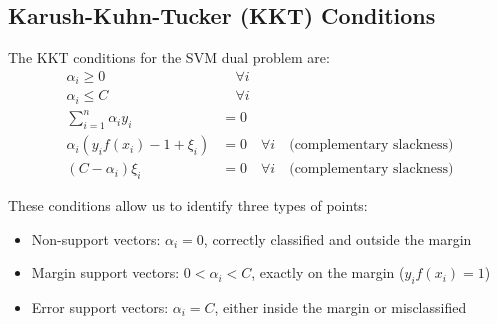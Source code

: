 \documentclass[11pt]{article}
\begin{document}

\subsection{Karush-Kuhn-Tucker (KKT) Conditions}
The KKT conditions for the SVM dual problem are:
\begin{align}
\alpha_i \geq 0 &\quad \forall i \\
\alpha_i \leq C &\quad \forall i \\
\sum_{i=1}^n \alpha_i y_i &= 0 \\
\alpha_i(y_i f(x_i) - 1 + \xi_i) &= 0 \quad \forall i \quad \text{(complementary slackness)} \\
(C - \alpha_i)\xi_i &= 0 \quad \forall i \quad \text{(complementary slackness)}
\end{align}

These conditions allow us to identify three types of points:
\begin{itemize}
    \item Non-support vectors: $\alpha_i = 0$, correctly classified and outside the margin
    \item Margin support vectors: $0 < \alpha_i < C$, exactly on the margin ($y_i f(x_i) = 1$)
    \item Error support vectors: $\alpha_i = C$, either inside the margin or misclassified
\end{itemize}
\end{document}
